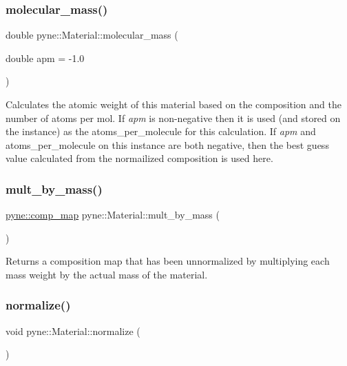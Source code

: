 \subsubsection{\texorpdfstring{molecular\+\_\+mass()}{molecular\_mass()}}
{\footnotesize\ttfamily double pyne\+::\+Material\+::molecular\+\_\+mass (\begin{DoxyParamCaption}\item[{double}]{apm = {\ttfamily -\/1.0} }\end{DoxyParamCaption})}

Calculates the atomic weight of this material based on the composition and the number of atoms per mol. If {\itshape apm} is non-\/negative then it is used (and stored on the instance) as the atoms\+\_\+per\+\_\+molecule for this calculation. If {\itshape apm} and atoms\+\_\+per\+\_\+molecule on this instance are both negative, then the best guess value calculated from the normailized composition is used here. \mbox{\label{classpyne_1_1_material_ad561ad2e529cbdcc0c73b10b067289fd}} 
\subsubsection{\texorpdfstring{mult\+\_\+by\+\_\+mass()}{mult\_by\_mass()}}
{\footnotesize\ttfamily \hyperlink{namespacepyne_a86738cecccf4ce3f4ecc2ff6f45ce1a2}{pyne\+::comp\+\_\+map} pyne\+::\+Material\+::mult\+\_\+by\+\_\+mass (\begin{DoxyParamCaption}{ }\end{DoxyParamCaption})}

Returns a composition map that has been unnormalized by multiplying each mass weight by the actual mass of the material. \mbox{\label{classpyne_1_1_material_ad27e37568bc08020d3886bb6284bc61d}} 
\subsubsection{\texorpdfstring{normalize()}{normalize()}}
{\footnotesize\ttfamily void pyne\+::\+Material\+::normalize (\begin{DoxyParamCaption}{ }\end{DoxyParamCaption})}

